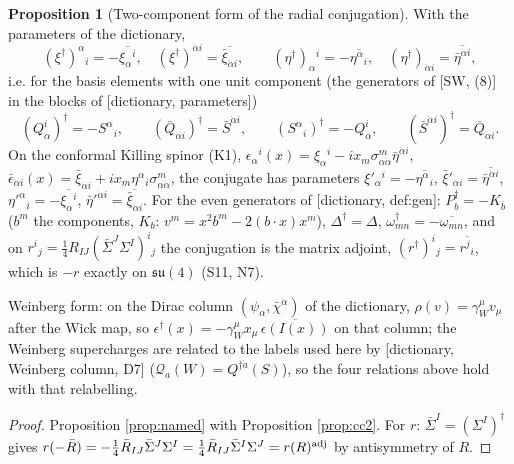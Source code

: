 \documentclass[11pt]{article}
\theoremstyle{definition}
\newtheorem{proposition}[definition]{Proposition}
\begin{document}
\begin{proposition}[Two-component form of the radial conjugation]
\label{prop:dag2}
With the parameters of the dictionary,
\[
(\xi^\dagger)^\alpha{}_i=-\overline{\xi_\alpha{}^i},\quad (\xi^\dagger)^{\dot\alpha i}=\overline{\bar\xi_{\dot\alpha i}},\qquad (\eta^\dagger)_\alpha{}^i=-\overline{\eta^\alpha{}_i},\quad (\eta^\dagger)_{\dot\alpha i}=\overline{\bar\eta^{\dot\alpha i}},
\]
i.e. for the basis elements with one unit component (the generators of [SW, (8)] in the blocks of [dictionary, parameters])
\[
(Q^i_\alpha)^\dagger=-S^\alpha{}_i,\qquad (\bar Q_{\dot\alpha i})^\dagger=\bar S^{\dot\alpha i},\qquad (S^\alpha{}_i)^\dagger=-Q^i_\alpha,\qquad (\bar S^{\dot\alpha i})^\dagger=\bar Q_{\dot\alpha i}.
\]
On the conformal Killing spinor (K1), $\epsilon_\alpha{}^i(x)=\xi_\alpha{}^i-ix_m\sigma^m_{\alpha\dot\alpha}\bar\eta^{\dot\alpha i}$, $\bar\epsilon_{\dot\alpha i}(x)=\bar\xi_{\dot\alpha i}+ix_m\eta^\alpha{}_i\sigma^m_{\alpha\dot\alpha}$, the conjugate has parameters $\xi'_\alpha{}^i=-\overline{\eta^\alpha{}_i}$, $\bar\xi'_{\dot\alpha i}=\overline{\bar\eta^{\dot\alpha i}}$, $\eta'^\alpha{}_i=-\overline{\xi_\alpha{}^i}$, $\bar\eta'^{\dot\alpha i}=\overline{\bar\xi_{\dot\alpha i}}$. For the even generators of [dictionary, def:gen]: $P_b^\dagger=-K_{\bar b}$ ($b^m$ the components, $K_b$: $v^m=x^2b^m-2(b\cdot x)x^m$), $\Delta^\dagger=\Delta$, $\omega_{mn}^\dagger=-\overline{\omega_{mn}}$, and on $r^i{}_j=\tfrac14R_{IJ}(\bar\Sigma^J\Sigma^I)^i{}_j$ the conjugation is the matrix adjoint, $(r^\dagger)^i{}_j=\overline{r^j{}_i}$, which is $-r$ exactly on $\mathfrak{su}(4)$ (S11, N7).

Weinberg form: on the Dirac column $(\psi_\alpha,\bar\chi^{\dot\alpha})$ of the dictionary, $\rho(v)=\gamma_W^\mu v_\mu$ after the Wick map, so $\epsilon^\dagger(x)=-\gamma_W^\mu x_\mu\,\overline{\epsilon(I(x))}$ on that column; the Weinberg supercharges are related to the labels used here by [dictionary, Weinberg column, D7] ($\mathcal Q_a(W)=Q^{\dagger\dot a}(S)$), so the four relations above hold with that relabelling.
\end{proposition}

\begin{proof}
Proposition \ref{prop:named} with Proposition \ref{prop:cc2}. For $r$: $\bar\Sigma^I=(\Sigma^I)^\dagger$ gives $r(-\bar R)=-\frac14\bar R_{IJ}\bar\Sigma^J\Sigma^I=\frac14\bar R_{IJ}\bar\Sigma^I\Sigma^J=r(R)^{\rm adj}$ by antisymmetry of $R$.
\end{proof}

\end{document}
